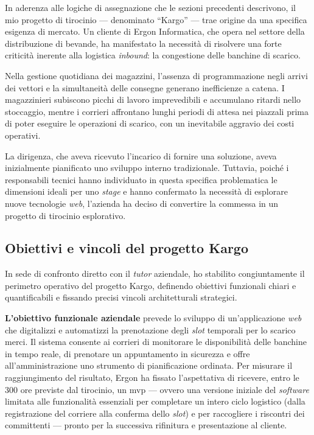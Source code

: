In aderenza alle logiche di assegnazione che le sezioni precedenti descrivono, il mio progetto di tirocinio --- denominato ``Kargo'' --- trae origine da una specifica esigenza di mercato. Un cliente di Ergon Informatica, che opera nel settore della distribuzione di bevande, ha manifestato la necessità di risolvere una forte criticità inerente alla logistica \textit{inbound}: la congestione delle banchine di scarico. 

Nella gestione quotidiana dei magazzini, l'assenza di programmazione negli arrivi dei vettori e la simultaneità delle consegne generano inefficienze a catena. I magazzinieri subiscono picchi di lavoro imprevedibili e accumulano ritardi nello stoccaggio, mentre i corrieri affrontano lunghi periodi di attesa nei piazzali prima di poter eseguire le operazioni di scarico, con un inevitabile aggravio dei costi operativi.

La dirigenza, che aveva ricevuto l'incarico di fornire una soluzione, aveva inizialmente pianificato uno sviluppo interno tradizionale. Tuttavia, poiché i responsabili tecnici hanno individuato in questa specifica problematica le dimensioni ideali per uno \textit{stage} e hanno confermato la necessità di esplorare nuove tecnologie \textit{web}, l'azienda ha deciso di convertire la commessa in un progetto di tirocinio esplorativo.

\subsection{Obiettivi e vincoli del progetto Kargo}
\label{subsec:obiettivi_vincoli_kargo}

In sede di confronto diretto con il \textit{tutor} aziendale, ho stabilito congiuntamente il perimetro operativo del progetto Kargo, definendo obiettivi funzionali chiari e quantificabili e fissando precisi vincoli architetturali strategici.

\textbf{L'obiettivo funzionale aziendale} prevede lo sviluppo di un'applicazione \textit{web} che digitalizzi e automatizzi la prenotazione degli \textit{slot} temporali per lo scarico merci. Il sistema consente ai corrieri di monitorare le disponibilità delle banchine in tempo reale, di prenotare un appuntamento in sicurezza e offre all'amministrazione uno strumento di pianificazione ordinata. Per misurare il raggiungimento del risultato, Ergon ha fissato l'aspettativa di ricevere, entro le 300 ore previste dal tirocinio, un \gls{mvp} --- ovvero una versione iniziale del \textit{software} limitata alle funzionalità essenziali per completare un intero ciclo logistico (dalla registrazione del corriere alla conferma dello \textit{slot}) e per raccogliere i riscontri dei committenti --- pronto per la successiva rifinitura e presentazione al cliente.

